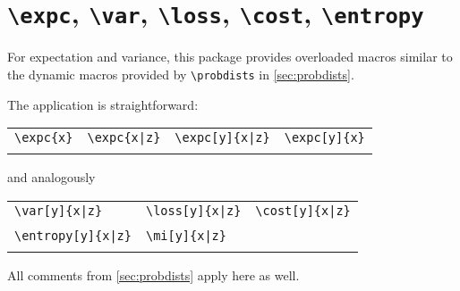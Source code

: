 \section{\texttt{\textbackslash expc}, \texttt{\textbackslash var}, \texttt{\textbackslash loss}, \texttt{\textbackslash cost}, \texttt{\textbackslash entropy}}
For expectation and variance, this package provides overloaded macros similar to the dynamic macros provided by \texttt{\textbackslash probdists} in \cref{sec:probdists}.

The application is straightforward:

\begin{table}[h!]
	\centering
	\begin{tabular}{llll}
		\verb|\expc{x}| & \verb+\expc{x|z}+ &\verb+\expc[y]{x|z}+ &\verb|\expc[y]{x}|\\
		 \expc{x} & \expc{x|z} & \expc[y]{x|z} & \expc[y]{x} \\
	\end{tabular}
\end{table}
and analogously

\begin{table}[h!]
	\centering

	\begin{tabular}{*{3}{l}}

		\verb+\var[y]{x|z}+ & \verb+\loss[y]{x|z}+ & \verb+\cost[y]{x|z}+\\
		\var[y]{x|z} & \loss[y]{x|z} & \cost[y]{x|z} \\[1em]
		\verb+\entropy[y]{x|z}+&  \verb+\mi[y]{x|z}+ \\
		\entropy[y]{x|z} & \mi[y]{x|z}
	\end{tabular}
\end{table}
All comments from \cref{sec:probdists} apply here as well.